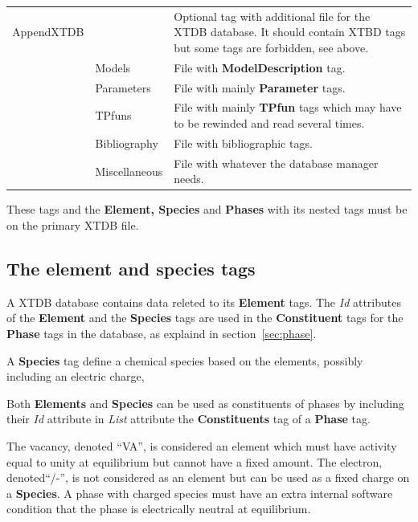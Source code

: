 \documentclass{article}
\begin{document}
\begin{tabular}{|p{} p{} p{}|}
AppendXTDB & & Optional tag with additional file for the XTDB database.  
              It should contain XTBD tags but some tags are forbidden,
              see above.\\
         & Models & File with {\bf ModelDescription} tag.\\
         & Parameters & File with mainly {\bf Parameter} tags.\\
              & TPfuns & File with mainly {\bf TPfun} tags which may have to
              be rewinded and read several times.\\
         & Bibliography & File with bibliographic tags.\\
         & Miscellaneous & File with whatever the database manager needs.\\\hline
\end{tabular}

These tags and the {\bf Element, Species} and {\bf Phases} with its
nested tags must be on the primary XTDB file.

\newpage

\subsection{The element and species tags}\label{sec:elements}

A XTDB database contains data releted to its {\bf Element} tags.  The
{\em Id} attributes of the {\bf Element} and the {\bf Species} tags
are used in the {\bf Constituent} tags for the {\bf Phase} tags in the
database, as explaind in section~\ref{sec:phase}.

A {\bf Species} tag define a chemical species based on the elements,
possibly including an electric charge,

Both {\bf Elements} and {\bf Species} can be used as constituents of
phases by including their {\em Id} attribute in {\em List} attribute
the {\bf Constituents} tag of a {\bf Phase} tag.

The vacancy, denoted ``VA'', is considered an element which must have
activity equal to unity at equilibrium but cannot have a fixed amount.
The electron, denoted``/-'', is not considered as an element but can
be used as a fixed charge on a {\bf Species}.  A phase with charged
species must have an extra internal software condition that the phase
is electrically neutral at equilibrium.
\end{document}
